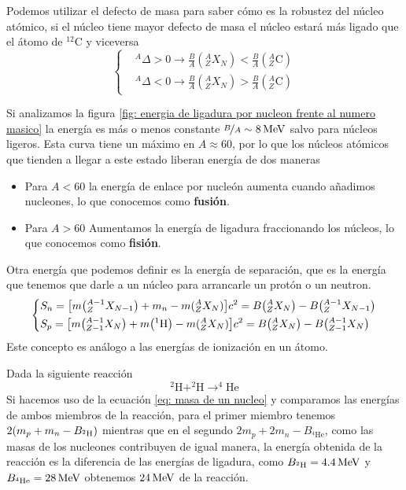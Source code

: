 Podemos utilizar el defecto de masa para saber cómo es la robustez del núcleo atómico, si el núcleo tiene mayor defecto de masa el núcleo estará más ligado que el átomo de $^{12}$C y viceversa
    $$\left \{ \begin{aligned}
        &^A \Delta >0 \xrightarrow[]{} \frac{B}{A}(^A_Z X_N)< \frac{B}{A}(^A_Z \mathrm{C})\\
        &^A \Delta <0 \xrightarrow[]{} \frac{B}{A}(^A_Z X_N)> \frac{B}{A}(^A_Z \mathrm{C})
    \end{aligned}   \right.$$

Si analizamos la figura \ref{fig: energia de ligadura por nucleon frente al numero masico} la energía es más o menos constante $\nicefrac{B}{A}\sim \unit[8]{MeV}$ salvo para núcleos ligeros. Esta curva tiene un máximo en $A\approx 60$, por lo que los núcleos atómicos que tienden a llegar a  este estado liberan energía de dos maneras
\begin{itemize}
    \item Para $A<60$ la energía de enlace por nucleón aumenta cuando añadimos nucleones, lo que conocemos como \textbf{fusión}.
    \item Para $A>60$ Aumentamos la energía de ligadura fraccionando los núcleos, lo que conocemos como \textbf{fisión}.
\end{itemize}

    Otra energía que podemos definir es la energía de separación, que es la energía que tenemos que darle a un núcleo para arrancarle un protón o un neutron.
    \begin{equation}
        \left \{  \begin{aligned}
    & S_n=\qty[m\qty(^{A-1}_Z X_{N-1})+m_n-m(^A_Z X_N)]c^2=B\qty(^A_Z X_N)-B\qty(^{A-1}_Z X_{N-1})\\
    &S_p=\qty[m\qty(^{A-1}_{Z-1} X_{N})+m\qty(^1\mathrm{H})-m(^A_Z X_N)]c^2=B\qty(^A_Z X_N)-B\qty(^{A-1}_{Z-1} X_{N})
        \end{aligned}
        \right.
        \label{eq: energías de separacion para el neutron y el proton}
    \end{equation}
    Este concepto es análogo a las energías de ionización en un átomo.\\
    \begin{tcolorbox}[colback=airforceblue!20, colframe=airforceblue, title={Ejemplo: Fusión del Deuterio en Helio-4}]
    Dada la siguiente reacción
    \begin{equation*}
        ^2\mathrm{H}+^2\mathrm{H} \longrightarrow ^4\mathrm{He}
    \end{equation*}
    Si hacemos uso de la ecuación \ref{eq: masa de un nucleo} y comparamos las energías de ambos miembros de la reacción, para el primer miembro tenemos  $2\qty(m_p+m_n-B_{^2\mathrm{H}})$ mientras que en el segundo $2m_p+2m_n-B_{^4\mathrm{He}}$, como las masas de los nucleones contribuyen de igual manera, la energía obtenida de la reacción es la diferencia de las energías de ligadura, como $\unit[B_{^2\mathrm{H}}=4.4]{MeV}$ y $\unit[B_{^4\mathrm{He}}=28]{MeV}$ obtenemos $\unit[24]{MeV}$ de la reacción.
\end{tcolorbox}

